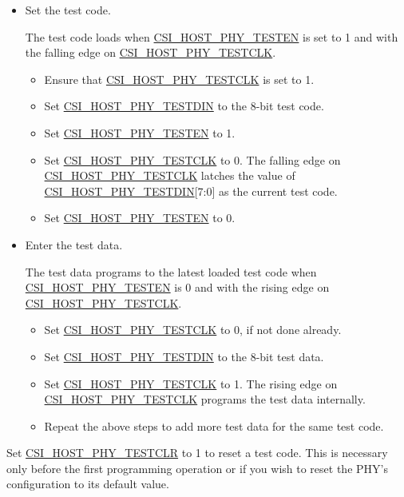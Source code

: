 \documentclass[main\_\_EN.tex]{subfiles}
\begin{document}
\begin{itemize}
    \item Set the test code.
    
    The test code loads when \hyperref[fielddesc:CSIHOSTPHYTESTEN]{CSI\_HOST\_PHY\_TESTEN} is set to 1 and with the falling edge on \hyperref[fielddesc:CSIHOSTPHYTESTCLK]{CSI\_HOST\_PHY\_TESTCLK}.
    \begin{itemize}
        \item Ensure that \hyperref[fielddesc:CSIHOSTPHYTESTCLK]{CSI\_HOST\_PHY\_TESTCLK} is set to 1.
        \item Set \hyperref[fielddesc:CSIHOSTPHYTESTDIN]{CSI\_HOST\_PHY\_TESTDIN} to the 8-bit test code. 
        \item Set \hyperref[fielddesc:CSIHOSTPHYTESTEN]{CSI\_HOST\_PHY\_TESTEN} to 1.
        \item Set \hyperref[fielddesc:CSIHOSTPHYTESTCLK]{CSI\_HOST\_PHY\_TESTCLK} to 0.
        The falling edge on \hyperref[fielddesc:CSIHOSTPHYTESTCLK]{CSI\_HOST\_PHY\_TESTCLK} latches the value of \hyperref[fielddesc:CSIHOSTPHYTESTDIN]{CSI\_HOST\_PHY\_TESTDIN}[7:0] as the current test code.
        \item Set \hyperref[fielddesc:CSIHOSTPHYTESTEN]{CSI\_HOST\_PHY\_TESTEN} to 0.
    \end{itemize}
    \item Enter the test data.
    
    The test data programs to the latest loaded test code when \hyperref[fielddesc:CSIHOSTPHYTESTEN]{CSI\_HOST\_PHY\_TESTEN} is 0 and with the rising edge on \hyperref[fielddesc:CSIHOSTPHYTESTCLK]{CSI\_HOST\_PHY\_TESTCLK}.
    \begin{itemize}
        \item Set \hyperref[fielddesc:CSIHOSTPHYTESTCLK]{CSI\_HOST\_PHY\_TESTCLK} to 0, if not done already.
        \item Set \hyperref[fielddesc:CSIHOSTPHYTESTDIN]{CSI\_HOST\_PHY\_TESTDIN} to the 8-bit test data.
        \item Set \hyperref[fielddesc:CSIHOSTPHYTESTCLK]{CSI\_HOST\_PHY\_TESTCLK} to 1. The rising edge on \hyperref[fielddesc:CSIHOSTPHYTESTCLK]{CSI\_HOST\_PHY\_TESTCLK} programs the test data internally.
        \item Repeat the above steps to add more test data for the same test code.
    \end{itemize}
\end{itemize}

Set \hyperref[fielddesc:CSIHOSTPHYTESTCLR]{CSI\_HOST\_PHY\_TESTCLR} to 1 to reset a test code. This is necessary only before the first programming operation or if you wish to reset the PHY's configuration to its default value.
\end{document}
